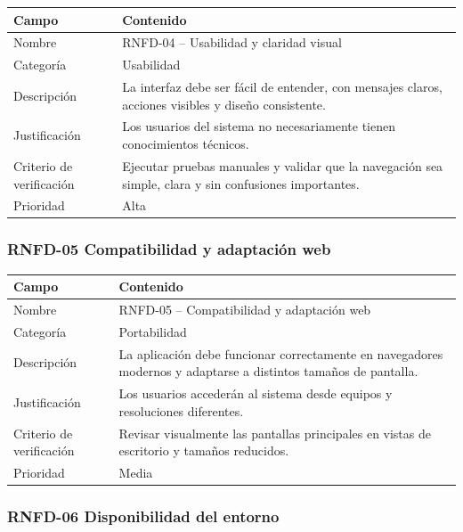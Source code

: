\documentclass[12pt]{article}
\begin{document}
\begin{tabularx}{\textwidth}{|P{3.3cm}|Y|}
\hline
{}
\textbf{Campo} & \textbf{Contenido} \\
\hline
Nombre & RNFD-04 -- Usabilidad y claridad visual \\
\hline
Categor\'ia & Usabilidad \\
\hline
Descripci\'on & La interfaz debe ser f\'acil de entender, con mensajes claros, acciones visibles y dise\~no consistente. \\
\hline
Justificaci\'on & Los usuarios del sistema no necesariamente tienen conocimientos t\'ecnicos. \\
\hline
Criterio de verificaci\'on & Ejecutar pruebas manuales y validar que la navegaci\'on sea simple, clara y sin confusiones importantes. \\
\hline
Prioridad & Alta \\
\hline
\end{tabularx}

\subsubsection{RNFD-05 Compatibilidad y adaptaci\'on web}

\begin{tabularx}{\textwidth}{|P{3.3cm}|Y|}
\hline
{}
\textbf{Campo} & \textbf{Contenido} \\
\hline
Nombre & RNFD-05 -- Compatibilidad y adaptaci\'on web \\
\hline
Categor\'ia & Portabilidad \\
\hline
Descripci\'on & La aplicaci\'on debe funcionar correctamente en navegadores modernos y adaptarse a distintos tama\~nos de pantalla. \\
\hline
Justificaci\'on & Los usuarios acceder\'an al sistema desde equipos y resoluciones diferentes. \\
\hline
Criterio de verificaci\'on & Revisar visualmente las pantallas principales en vistas de escritorio y tama\~nos reducidos. \\
\hline
Prioridad & Media \\
\hline
\end{tabularx}

\subsubsection{RNFD-06 Disponibilidad del entorno}
\end{document}

